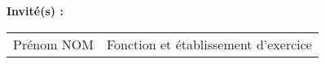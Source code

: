 {%



\vspace{\baselineskip}
{\normalTwelve \textbf{Invit\'{e}(s) :}}\\ \newline
\footnotesizeTwelve
\begin{tabular}{@{}ll}
Pr\'{e}nom NOM & Fonction et \'{e}tablissement d'exercice \\
\end{tabular}
}

\maketitle
